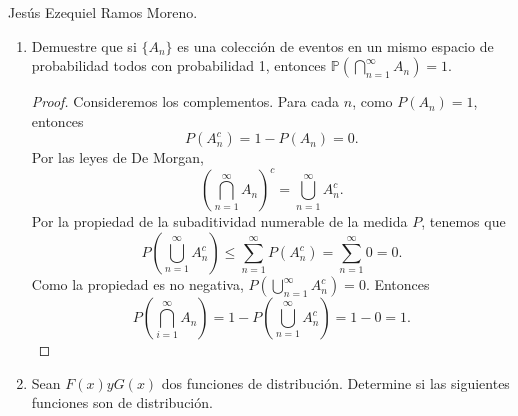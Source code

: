 \documentclass{article}
\newcommand{\ntarea}{1}
\begin{document}
\pagestyle{fancy}
\rhead{Tarea \ntarea}

\large{Jesús Ezequiel Ramos Moreno.}
\begin{enumerate}
    \item[2.] Demuestre que si \(\{A_n\}\) es una colección de eventos en un mismo espacio de probabilidad todos con probabilidad 1, entonces \(\mathbb{P}(\bigcap_{n=1}^{\infty} A_n) = 1\).
    \begin{proof}
        Consideremos los complementos. Para cada \(n\), como \(P(A_n) = 1\), entonces
        \[
        P(A_n^c) = 1 - P(A_n) = 0.
        \]
        Por las leyes de De Morgan,
        \[
        {\left(\bigcap_{n = 1}^\infty A_n\right)}^c = \bigcup_{n = 1}^\infty A_n ^c.
        \]
        Por la propiedad de la subaditividad numerable de la medida \(P\), tenemos que
        \[
        P\left(\bigcup_{n = 1} ^\infty A_n ^c\right) \leq \sum_{n = 1}^{\infty}P(A_n^c) = \sum_{n=1}^{\infty}0 = 0.
        \]
        Como la propiedad es no negativa, \(P\left(\bigcup_{n = 1} ^\infty A_n ^c\right) = 0\). Entonces 
        \[
        P\left(\bigcap_{i = 1}^\infty A_n\right) = 1 - P\left(\bigcup_{n = 1} ^\infty A_n ^c\right) = 1 - 0 = 1.
        \]
    \end{proof}
    \item[4.] Sean \(F(x) y G(x)\) dos funciones de distribución. Determine si las siguientes funciones son de distribución.
\end{enumerate}
\end{document}
